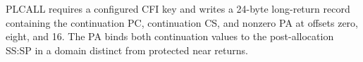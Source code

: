 PLCALL requires a configured CFI key and writes a 24-byte long-return record containing the continuation PC, continuation CS, and nonzero PA at offsets zero, eight, and 16. The PA binds both continuation values to the post-allocation SS:SP in a domain distinct from protected near returns.
